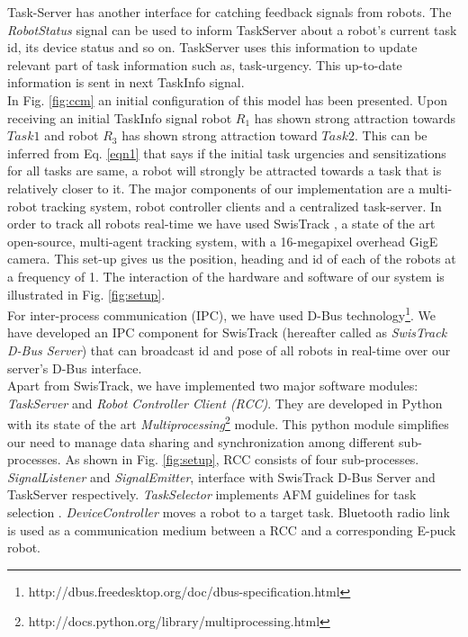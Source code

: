 \documentclass[smallcondensed]{svjour3}
\begin{document}
Task-Server has another interface for catching feedback signals from robots. The \textit{RobotStatus} signal can be used to inform TaskServer about a robot's current task id, its device status and so on. TaskServer uses this information to update relevant part of task information such as, task-urgency. This up-to-date information is sent in next TaskInfo signal.\\
In Fig. \ref{fig:ccm} an initial configuration of this model has been presented. Upon receiving an initial TaskInfo signal robot $R_1$ has shown strong attraction towards $Task1$ and robot $R_3$ has shown strong attraction toward $Task2$. This can be inferred from Eq. \ref{eqn1} that says if the initial task urgencies and sensitizations for all tasks are same, a robot will strongly be attracted towards a task that is relatively closer to it.
The major components of our implementation are a multi-robot tracking system, robot controller clients and a centralized task-server. In order to track all robots real-time we have used SwisTrack \citep{Lochmatter+2008}, a state of the art open-source, multi-agent tracking system, with a 16-megapixel overhead GigE camera. This set-up gives us the position, heading and id of each of the robots at a frequency of 1. The interaction of the hardware and software of our system is illustrated in Fig. \ref{fig:setup}. \\
For inter-process communication (IPC), we have used D-Bus technology\footnote{http://dbus.freedesktop.org/doc/dbus-specification.html}. We have developed an IPC component for SwisTrack (hereafter called as \textit{SwisTrack D-Bus Server}) that can broadcast id and pose of all robots in real-time over our server's D-Bus interface.\\
Apart from SwisTrack, we have implemented two major software modules: {\em TaskServer} and {\em Robot Controller Client (RCC)}. They are developed in Python with its state of the art \textit{Multiprocessing}\footnote{http://docs.python.org/library/multiprocessing.html} module. This python module simplifies our need to manage data sharing and synchronization among different sub-processes. As shown in Fig. \ref{fig:setup}, RCC consists of four sub-processes. {\em SignalListener} and {\em SignalEmitter}, interface with SwisTrack D-Bus Server and TaskServer respectively. {\em TaskSelector} implements AFM guidelines for task selection . {\em DeviceController} moves a robot to a target task. Bluetooth radio link is used as a communication medium between a RCC and a corresponding E-puck robot. 
\end{document}
